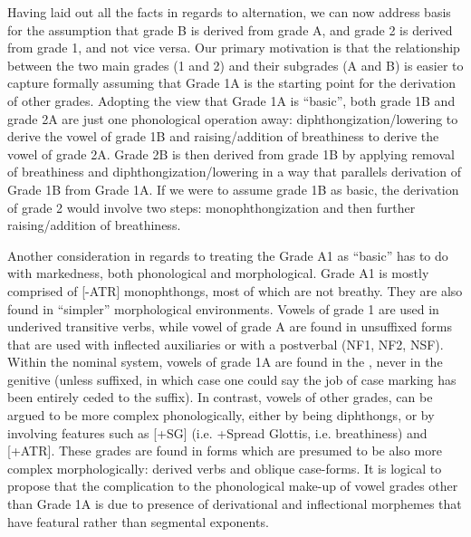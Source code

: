 \documentclass[output=paper
,newtxmath
,modfonts
,nonflat]{langsci/langscibook}
\begin{document}
Having laid out all the facts in regards to  alternation, we can now address basis for the assumption that grade B is derived from grade A, and grade 2 is derived from grade 1, and not vice versa.  Our primary motivation is that the relationship between the two main grades (1 and 2) and their subgrades (A and B) is easier to capture formally assuming that Grade 1A is the starting point for the derivation of other grades.  Adopting the view that Grade 1A is “basic”, both grade 1B and grade 2A are just one phonological operation away: diphthongization/lowering to derive the vowel of grade 1B and raising/addition of breathiness to derive the vowel of grade 2A.  Grade 2B is then derived from grade 1B by applying removal of breathiness and diphthongization/lowering in a way that parallels derivation of Grade 1B from Grade 1A.  If we were to assume grade 1B as basic, the derivation of grade 2 would involve two steps: monophthongization and then further raising/addition of breathiness.  

Another consideration in regards to treating the Grade A1 as “basic” has to do with markedness, both phonological and morphological.  Grade A1 is mostly comprised of [-ATR] monophthongs, most of which are not breathy.  They are also found in “simpler” morphological environments.  Vowels of grade 1 are used in underived transitive verbs, while vowel of grade A are found in unsuffixed forms that are used with inflected auxiliaries or with a postverbal  (NF1, NF2, NSF).  Within the nominal system, vowels of grade 1A are found in the , never in the genitive (unless suffixed, in which case one could say the job of case marking has been entirely ceded to the suffix).  In contrast, vowels of other grades, can be argued to be more complex phonologically, either by being diphthongs, or by involving features such as [+SG] (i.e. +Spread Glottis, i.e. breathiness) and [+ATR].  These grades are found in forms which are presumed to be also more complex morphologically: derived verbs and oblique case-forms.  It is logical to propose that the complication to the phonological make-up of vowel grades other than Grade 1A is due to presence of derivational and inflectional morphemes that have featural rather than segmental exponents.    
\end{document}
